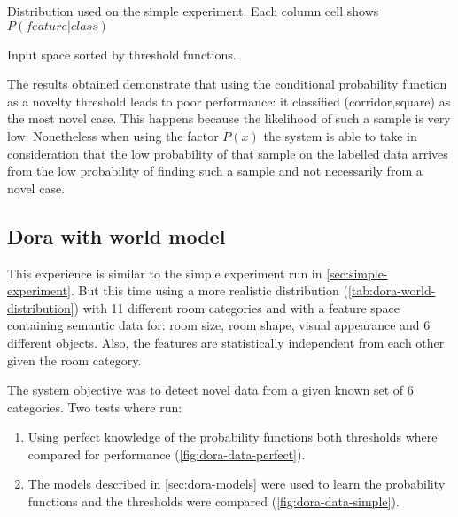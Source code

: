 \documentclass[a4paper]{article}
\begin{document}
\begin{table}[hb]
\begin{center}

\end{center}
\caption{\label{tab:simple-distribution}Distribution used on the simple experiment. Each column cell shows $P(feature|class)$}
\end{table}

\begin{table}
\centering
{}
\qquad
{}
\caption{\label{tab:simple-data-sorted}Input space sorted by threshold functions.}
\end{table}

The results obtained demonstrate that using the conditional probability function
as a novelty threshold leads to poor performance: it classified (corridor,square) as
the most novel case.
This happens because the likelihood of such a sample is very low.
Nonetheless when using the factor $P(x)$ the system is able to take in consideration
that the low probability of that sample on the labelled data arrives from the low
probability of finding such a sample and not necessarily from a novel case.



\subsection{Dora with world model}
\label{sec:dora-experiment}

This experience is similar to the simple experiment run in \autoref{sec:simple-experiment}.
But this time using a more realistic distribution (\autoref{tab:dora-world-distribution}) with
11 different room categories and with a feature space containing semantic data for:
room size, room shape, visual appearance and 6 different objects.
Also, the features are statistically independent from each other given the room category.

The system objective was to detect novel data from a given known set of 6 categories.
Two tests where run:
\begin{enumerate}
\item Using perfect knowledge of the probability functions both thresholds where compared for performance (\autoref{fig:dora-data-perfect}).
\item The models described in \autoref{sec:dora-models} were used to learn the probability functions and the thresholds were compared (\autoref{fig:dora-data-simple}).
\end{enumerate}
\end{document}
